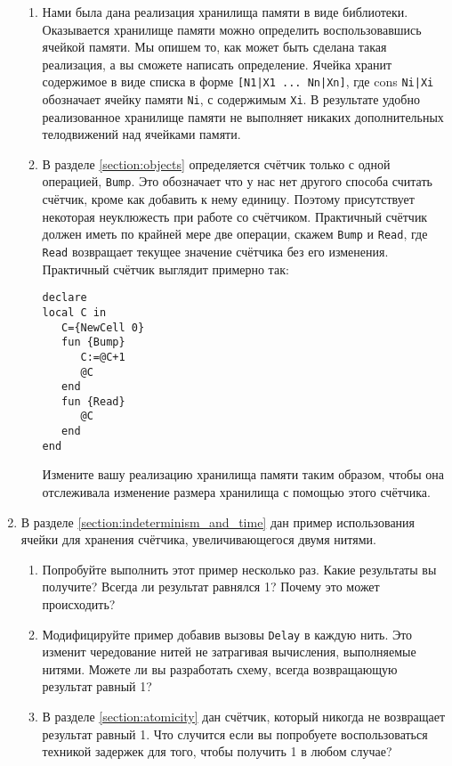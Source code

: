 \begin{enumerate}
{\begin{enumerate}
{Если посмотреть извне, то \lstinline|FasterPascal| это тот же \lstinline|FastPascal|, но быстрее.}

\item{Нами была дана реализация хранилища памяти в виде библиотеки. Оказывается хранилище памяти можно определить воспользовавшись ячейкой памяти. Мы опишем то, как может быть сделана такая реализация, а вы сможете написать определение. Ячейка хранит содержимое в виде списка в форме \lstinline![N1|X1 ... Nn|Xn]!, где cons \lstinline!Ni|Xi! обозначает ячейку памяти \lstinline|Ni|, с содержимым \lstinline|Xi|. В результате удобно реализованное хранилище памяти не выполняет никаких дополнительных телодвижений над ячейками памяти.}

\item{В разделе \ref{section:objects} определяется счётчик только с одной операцией, \lstinline|Bump|. Это обозначает что у нас нет другого способа считать счётчик, кроме как добавить к нему единицу. Поэтому присутствует некоторая неуклюжесть при работе со счётчиком. Практичный счётчик должен иметь по крайней мере две операции, скажем \lstinline|Bump| и \lstinline|Read|, где \lstinline|Read| возвращает текущее значение счётчика без его изменения. Практичный счётчик выглядит примерно так:

\begin{lstlisting}
declare
local C in
   C={NewCell 0}
   fun {Bump}
      C:=@C+1
      @C
   end
   fun {Read}
      @C
   end
end
  \end{lstlisting}

Измените вашу реализацию хранилища памяти таким образом, чтобы она отслеживала изменение размера хранилища с помощью этого счётчика.}
\end{enumerate}


}

  \item{В разделе \ref{section:indeterminism_and_time} дан пример использования ячейки для хранения счётчика, увеличивающегося двумя нитями.
\begin{enumerate}
\item{Попробуйте выполнить этот пример несколько раз. Какие результаты вы получите? Всегда ли результат равнялся 1? Почему это может происходить?}

\item{Модифицируйте пример добавив вызовы \lstinline|Delay| в каждую нить. Это изменит чередование нитей не затрагивая вычисления, выполняемые нитями. Можете ли вы разработать схему, всегда возвращающую результат равный 1?}

\item{В разделе \ref{section:atomicity} дан счётчик, который никогда не возвращает результат равный 1. Что случится если вы попробуете воспользоваться техникой задержек для того, чтобы получить 1 в любом случае?}
  \end{enumerate}
}
\end{enumerate}
